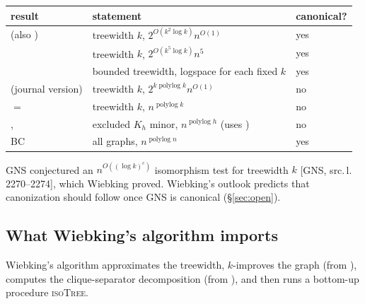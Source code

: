 \documentclass[11pt]{article}
\theoremstyle{plain}
\theoremstyle{definition}
\theoremstyle{remark}
\theoremstyle{named}
\theoremstyle{namedrm}
\newcommand{\polylog}{\operatorname{polylog}}
\newcommand{\src}[2]{[#1, src.\,l.\,#2]}
\begin{document}
\begin{center}\small
\begin{tabularx}{\linewidth}{@{}L{4.3cm}YL{2.2cm}@{}}
\toprule
result & statement & canonical?\\
\midrule
\cite[Thm.~6.13]{Wie21} (also \cite{GNSW}) & treewidth $k$, $2^{O(k^2\log k)}n^{O(1)}$ & yes\\
\cite{LPPS17} & treewidth $k$, $2^{O(k^5\log k)}n^5$ & yes\\
\cite{ES16} & bounded treewidth, logspace for each fixed $k$ & yes\\
\cite{GNSW} (journal version) & treewidth $k$, $2^{k\polylog k}n^{O(1)}$ & no \cite[pp.~9--10]{Wie21}\\
\cite[Thm.~35]{Wie20} $=$ \cite[Cor.~6.30]{Wie21} & treewidth $k$, $n^{\polylog k}$ & no\\
\cite[Thm.~6.29]{Wie21}, \cite{GNW} & excluded $K_h$ minor, $n^{\polylog h}$ (uses \cite{Neu20}) & no \cite[p.~179]{Wie21}\\
BC \cite{Bab19} & all graphs, $n^{\polylog n}$ & yes\\
\bottomrule
\end{tabularx}
\end{center}
GNS conjectured an $n^{O((\log k)^c)}$ isomorphism test for treewidth $k$ \src{GNS}{2270--2274}, which
Wiebking proved. Wiebking's outlook predicts that canonization should follow once GNS is canonical
(\S\ref{sec:open}).

\subsection{What Wiebking's algorithm imports}

Wiebking's algorithm \cite[proof of Thm.~35]{Wie20} approximates the treewidth, $k$-improves the graph
\cite[Lemma~29]{Wie20} (from \cite{LPPS17}), computes the clique-separator decomposition
\cite[Thm.~30]{Wie20} (from \cite{Lei93,ES16}), and then runs a bottom-up procedure \textsc{isoTree}.
\end{document}

